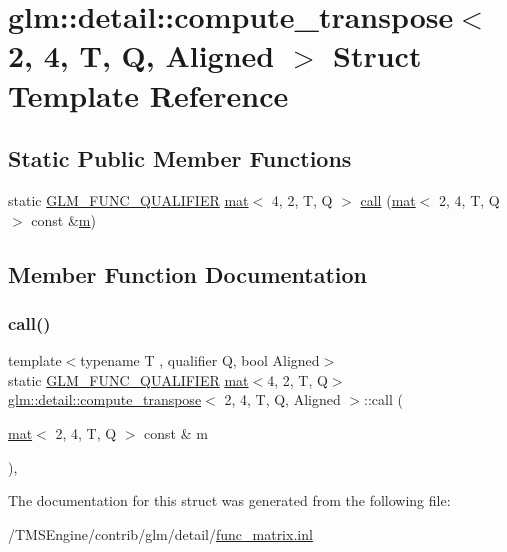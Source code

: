 \hypertarget{structglm_1_1detail_1_1compute__transpose_3_012_00_014_00_01_t_00_01_q_00_01_aligned_01_4}{}\section{glm\+:\+:detail\+:\+:compute\+\_\+transpose$<$ 2, 4, T, Q, Aligned $>$ Struct Template Reference}
\label{structglm_1_1detail_1_1compute__transpose_3_012_00_014_00_01_t_00_01_q_00_01_aligned_01_4}
\subsection*{Static Public Member Functions}
\begin{DoxyCompactItemize}
\item 
static \hyperlink{setup_8hpp_a33fdea6f91c5f834105f7415e2a64407}{G\+L\+M\+\_\+\+F\+U\+N\+C\+\_\+\+Q\+U\+A\+L\+I\+F\+I\+ER} \hyperlink{structglm_1_1mat}{mat}$<$ 4, 2, T, Q $>$ \hyperlink{structglm_1_1detail_1_1compute__transpose_3_012_00_014_00_01_t_00_01_q_00_01_aligned_01_4_a520d7f20fa96a98fd40229e593ac0b2a}{call} (\hyperlink{structglm_1_1mat}{mat}$<$ 2, 4, T, Q $>$ const \&\hyperlink{_s_d_l__opengl__glext_8h_af593500c283bf1a787a6f947f503a5c2}{m})
\end{DoxyCompactItemize}


\subsection{Member Function Documentation}
\mbox{\label{structglm_1_1detail_1_1compute__transpose_3_012_00_014_00_01_t_00_01_q_00_01_aligned_01_4_a520d7f20fa96a98fd40229e593ac0b2a}} 
\subsubsection{\texorpdfstring{call()}{call()}}
{\footnotesize\ttfamily template$<$typename T , qualifier Q, bool Aligned$>$ \\
static \hyperlink{setup_8hpp_a33fdea6f91c5f834105f7415e2a64407}{G\+L\+M\+\_\+\+F\+U\+N\+C\+\_\+\+Q\+U\+A\+L\+I\+F\+I\+ER} \hyperlink{structglm_1_1mat}{mat}$<$4, 2, T, Q$>$ \hyperlink{structglm_1_1detail_1_1compute__transpose}{glm\+::detail\+::compute\+\_\+transpose}$<$ 2, 4, T, Q, Aligned $>$\+::call (\begin{DoxyParamCaption}\item[{\hyperlink{structglm_1_1mat}{mat}$<$ 2, 4, T, Q $>$ const \&}]{m }\end{DoxyParamCaption})\hspace{0.3cm}{\ttfamily [inline]}, {\ttfamily [static]}}



The documentation for this struct was generated from the following file\+:\begin{DoxyCompactItemize}
\item 
/\+T\+M\+S\+Engine/contrib/glm/detail/\hyperlink{func__matrix_8inl}{func\+\_\+matrix.\+inl}\end{DoxyCompactItemize}
